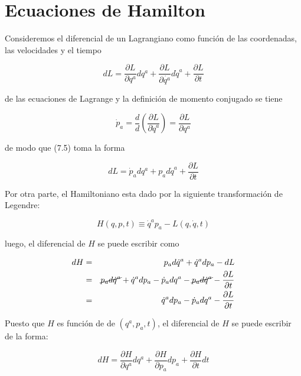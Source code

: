 \documentclass[12pt]{report}
\begin{document}
\section{Ecuaciones de Hamilton}


Consideremos el diferencial de un Lagrangiano como función de las coordenadas, las velocidades y el tiempo

\begin{equation}
dL= \frac{\partial L}{\partial q^a} dq^a + \frac{\partial L}{\partial \dot{q^a}} d\dot{q}^a + \frac{\partial L}{\partial t}
\end{equation} 

de las ecuaciones de Lagrange y la definición de momento conjugado se tiene

\begin{equation}
\dot{p}_a= \frac{d}{d}\left( \frac{\partial L}{\partial \dot{q}^a}  \right)= \frac{\partial L}{\partial q^a}
\end{equation}

de modo que (7.5) toma la forma  

\begin{equation}
dL=\dot{p}_a dq^a + p_a d\dot{q}^a + \frac{\partial L}{\partial t}
\end{equation}

Por otra parte, el Hamiltoniano esta dado por la siguiente transformación de Legendre:

\begin{equation}
H(q,p,t) \equiv \dot{q}^a p_a -L (q,\dot{q},t)
\end{equation}

luego, el diferencial de $H$ se puede escribir como

\begin{eqnarray}
dH&=&p_a d\dot{q}^a + \dot{q}^a dp_a - dL \\
&=&\cancel{p_a d\dot{q}^a} + \dot{q}^a dp_a - \dot{p}_a dq^a - \cancel{p_a d\dot{q}^a} - \frac{\partial L}{\partial t} \\
&=& \dot{q}^a dp_a - \dot{p}_a dq^a - \frac{\partial L}{\partial t}
\end{eqnarray}

Puesto que $H$ es función de de $(q^a,p_a,t)$, el diferencial de $H$ se puede escribir de la forma:

\begin{equation}
dH=\frac{\partial H}{\partial q^a}dq^a + \frac{\partial H}{\partial p_a}dp_a + \frac{\partial H}{\partial t}dt
\end{equation}
\end{document}
